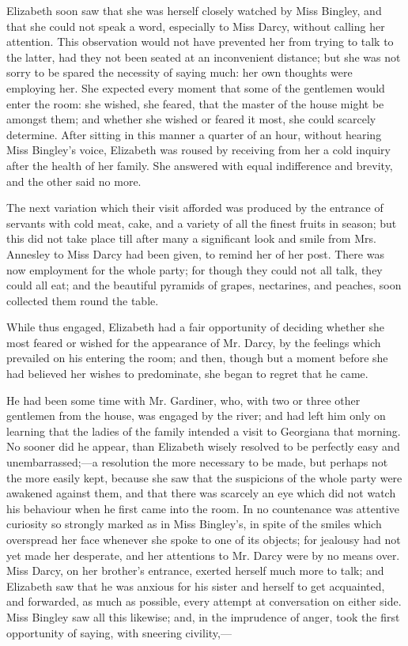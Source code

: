 \documentclass[12pt]{book}
\begin{document}
Elizabeth soon saw that she was herself closely watched by Miss Bingley, and that she could not speak a word, especially to Miss Darcy, without calling her attention. This observation would not have prevented her from trying to talk to the latter, had they not been seated at an inconvenient distance; but she was not sorry to be spared the necessity of saying much: her own thoughts were employing her. She expected every moment that some of the gentlemen would enter the room: she wished, she feared, that the master of the house might be amongst them; and whether she wished or feared it most, she could scarcely determine. After sitting in this manner a quarter of an hour, without hearing Miss Bingley's voice, Elizabeth was roused by receiving from her a cold inquiry after the health of her family. She answered with equal indifference and brevity, and the other said no more.

The next variation which their visit afforded was produced by the entrance of servants with cold meat, cake, and a variety of all the finest fruits in season; but this did not take place till after many a significant look and smile from Mrs. Annesley to Miss Darcy had been given, to remind her of her post. There was now employment for the whole party; for though they could not all talk, they could all eat; and the beautiful pyramids of grapes, nectarines, and peaches, soon collected them round the table.

While thus engaged, Elizabeth had a fair opportunity of deciding whether she most feared or wished for the appearance of Mr. Darcy, by the feelings which prevailed on his entering the room; and then, though but a moment before she had believed her wishes to predominate, she began to regret that he came.

He had been some time with Mr. Gardiner, who, with two or three other gentlemen from the house, was engaged by the river; and had left him only on learning that the ladies of the family intended a visit to Georgiana that morning. No sooner did he appear, than Elizabeth wisely resolved to be perfectly easy and unembarrassed;---a resolution the more necessary to be made, but perhaps not the more easily kept, because she saw that the suspicions of the whole party were awakened against them, and that there was scarcely an eye which did not watch his behaviour when he first came into the room. In no countenance was attentive curiosity so strongly marked as in Miss Bingley's, in spite of the smiles which overspread her face whenever she spoke to one of its objects; for jealousy had not yet made her desperate, and her attentions to Mr. Darcy were by no means over. Miss Darcy, on her brother's entrance, exerted herself much more to talk; and Elizabeth saw that he was anxious for his sister and herself to get acquainted, and forwarded, as much as possible, every attempt at conversation on either side. Miss Bingley saw all this likewise; and, in the imprudence of anger, took the first opportunity of saying, with sneering civility,---
\end{document}
